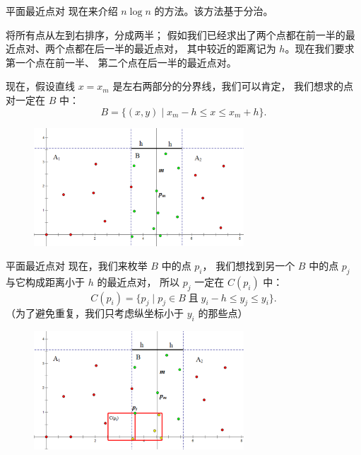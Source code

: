 \documentclass{beamer}
\begin{document}
\begin{frame}{平面最近点对}
    \footnotesize
    现在来介绍 $n\log n$ 的方法。该方法基于分治。

    \vspace{.5em}\pause
    将所有点从左到右排序，分成两半；
    假如我们已经求出了两个点都在前一半的最近点对、两个点都在后一半的最近点对，
    其中较近的距离记为 $h$。现在我们要求第一个点在前一半、
    第二个点在后一半的最近点对。

    \vspace{.5em}\pause
    现在，假设直线 $x=x_m$ 是左右两部分的分界线，我们可以肯定，
    我们想求的点对一定在 $B$ 中：
    \begin{equation*}
        B=\{(x,y)\;|\;x_m-h\leq x\leq x_m+h\}.
    \end{equation*}

    \begin{figure}[H]
        \centering
        \includegraphics[width=0.7\textwidth]{pic/nearest-points1.png}
    \end{figure}
\end{frame}

\begin{frame}{平面最近点对}
    \footnotesize
    现在，我们来枚举 $B$ 中的点 $p_i$，
    我们想找到另一个 $B$ 中的点 $p_j$ 与它构成距离小于 $h$ 的最近点对，
    所以 $p_j$ 一定在 $C(p_i)$ 中：
    \begin{equation*}
        C(p_i)=\{p_j\;|\;p_j\in B \;\text{且}\; y_i-h \leq y_j \leq y_i\}.
    \end{equation*}
    （为了避免重复，我们只考虑纵坐标小于 $y_i$ 的那些点）

    \begin{figure}[H]
        \centering
        \includegraphics[width=0.7\textwidth]{pic/nearest-points2.png}
    \end{figure}
\end{frame}
\end{document}
